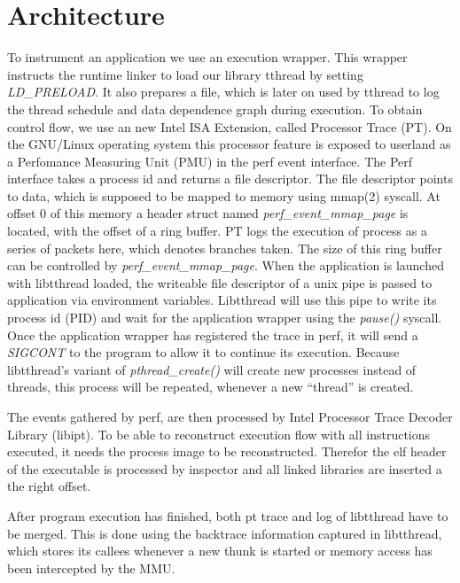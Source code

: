 \section{Architecture}
\label{sec:introduction}

To instrument an application we use an execution wrapper. This wrapper instructs
the runtime linker to load our library tthread by setting \emph{LD\_PRELOAD}. It
also prepares a file, which is later on used by tthread to log the thread
schedule and data dependence graph during execution. To obtain control flow, we
use an new Intel ISA Extension, called Processor Trace (PT). On the GNU/Linux
operating system this processor feature is exposed to userland as a Perfomance
Measuring Unit (PMU) in the perf event interface. The Perf interface takes a
process id and returns a file descriptor. The file descriptor points to data,
which is supposed to be mapped to memory using mmap(2) syscall. At offset 0 of this memory
a header struct named \emph{perf_event_mmap_page} is located, with the offset of a ring buffer.
PT logs the execution of process as a series of packets here, which denotes branches taken.
The size of this ring buffer can be controlled by \emph{perf_event_mmap_page}.
When the application is launched with libtthread loaded, the writeable file descriptor of
a unix pipe is passed to application via environment variables.  Libtthread will
use this pipe to write its process id (PID) and wait for the application wrapper using
the \emph{pause()} syscall. Once the application wrapper has registered the
trace in perf, it will send a \emph{SIGCONT} to the program to allow it to
continue its execution. Because libtthread's variant of \emph{pthread\_create()}
will create new processes instead of threads, this process will be repeated,
whenever a new "`thread"' is created.

The events gathered by perf, are then processed by Intel Processor Trace Decoder Library (libipt).
To be able to reconstruct execution flow with all instructions executed,
it needs the process image to be reconstructed. Therefor the elf header of the
executable is processed by inspector and all linked libraries are inserted a the right offset.

After program execution has finished, both pt trace and log of libtthread have to be merged.
This is done using the backtrace information captured in libtthread, which
stores its callees whenever a new thunk is started or memory access has been
intercepted by the MMU.

